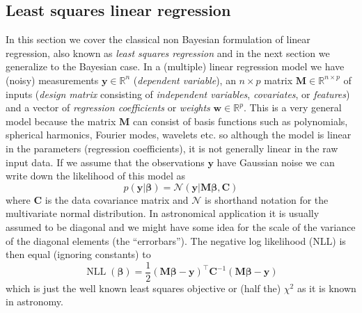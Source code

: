 \documentclass[12pt,dvipsnames]{report}
\renewcommand{\vec}[1]{\boldsymbol{\mathbf{#1}}}
\begin{document}
\subsection{Least squares linear regression}
\label{ssec:least_squares}
In this section we cover the classical non Bayesian formulation of linear
regression, also known as \emph{least squares regression} and in the next
section we generalize to the Bayesian case. In a (multiple) linear regression
model we have (noisy) measurements $\vec{y}\in \mathbb{R}^n$ (\emph{dependent
    variable}), an $n\times p$ matrix $\vec{M}\in \mathbb{R}^{n\times p}$ of inputs
(\emph{design matrix} consisting of \emph{independent variables},
\emph{covariates}, or \emph{features}) and a vector of \emph{regression
    coefficients} or \emph{weights} $\vec{w}\in \mathbb{R}^p$. This is a very
general model because the matrix $\vec{M}$ can consist of basis functions such
as polynomials, spherical harmonics, Fourier modes, wavelets etc. so although
the model is linear in the parameters (regression coefficients), it is not
generally linear in the raw input data. If we assume that the observations
$\vec{y}$ have Gaussian noise we can write down the likelihood of this model as
\begin{equation}
    p(\vec{y}\lvert \vec \beta)=\mathcal{N}(\vec{y}\lvert\vec{M}\vec \beta, \vec{C})
\end{equation}
where $\vec{C}$ is the data covariance matrix and $\mathcal{N}$ is shorthand notation for
the multivariate normal distribution. In astronomical application it is usually
assumed to be diagonal and we might have some idea for the scale of the variance
of the diagonal elements (the ``errorbars'').
The negative log likelihood (NLL) is then equal (ignoring constants)  to
\begin{equation}
    \operatorname{NLL}(\vec \beta)=\frac{1}{2}(\vec{M} \vec\beta -\vec{y})^{\intercal}\vec{C}^{-1}(\vec{M} \vec\beta-\vec{y})
\end{equation}
which is just the well known least squares objective or (half the) $\chi^2$ as it is known
in astronomy.
\end{document}
